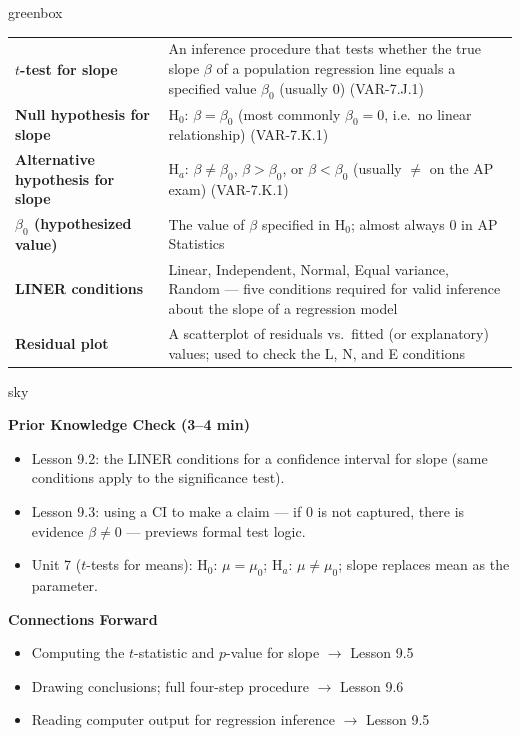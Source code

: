 \documentclass[10pt]{article}
\begin{document}
\begin{skillbox}{greenbox}
\renewcommand{\arraystretch}{1.3}
\begin{tabularx}{\linewidth}{lX}
    \textbf{$t$-test for slope} &
        An inference procedure that tests whether the true slope $\beta$ of a population
        regression line equals a specified value $\beta_0$ (usually 0) (VAR-7.J.1) \\
    \textbf{Null hypothesis for slope} &
        H$_0$: $\beta = \beta_0$ (most commonly $\beta_0 = 0$, i.e.\ no linear
        relationship) (VAR-7.K.1) \\
    \textbf{Alternative hypothesis for slope} &
        H$_a$: $\beta \ne \beta_0$, $\beta > \beta_0$, or $\beta < \beta_0$
        (usually $\ne$ on the AP exam) (VAR-7.K.1) \\
    \textbf{$\beta_0$ (hypothesized value)} &
        The value of $\beta$ specified in H$_0$; almost always 0 in AP Statistics \\
    \textbf{LINER conditions} &
        Linear, Independent, Normal, Equal variance, Random --- five conditions
        required for valid inference about the slope of a regression model \\
    \textbf{Residual plot} &
        A scatterplot of residuals vs.\ fitted (or explanatory) values; used to
        check the L, N, and E conditions \\
\end{tabularx}
\end{skillbox}

\begin{skillbox}{sky}
\begin{minipage}[t]{0.48\linewidth}
    \textbf{Prior Knowledge Check (3--4 min)}
    \begin{itemize}
        \item Lesson 9.2: the LINER conditions for a confidence interval for slope
              (same conditions apply to the significance test).
        \item Lesson 9.3: using a CI to make a claim --- if 0 is not captured, there
              is evidence $\beta \ne 0$ --- previews formal test logic.
        \item Unit 7 ($t$-tests for means): H$_0$: $\mu = \mu_0$; H$_a$: $\mu \ne \mu_0$;
              slope replaces mean as the parameter.
    \end{itemize}
\end{minipage}
\hfill
\begin{minipage}[t]{0.48\linewidth}
    \textbf{Connections Forward}
    \begin{itemize}
        \item Computing the $t$-statistic and $p$-value for slope $\to$ Lesson 9.5
        \item Drawing conclusions; full four-step procedure $\to$ Lesson 9.6
        \item Reading computer output for regression inference $\to$ Lesson 9.5
    \end{itemize}
\end{minipage}
\end{skillbox}
\end{document}
